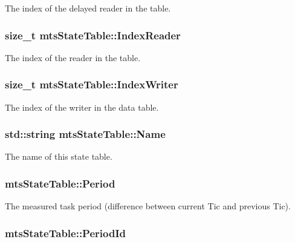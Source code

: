 The index of the delayed reader in the table. \hypertarget{classmts_state_table_a3735ec3378d9461a2a57028ec0e8aa70}{
\subsubsection[{Index\-Reader}]{\setlength{\rightskip}{0pt plus 5cm}size\-\_\-t mts\-State\-Table\-::\-Index\-Reader\hspace{0.3cm}{\ttfamily [protected]}}}\label{classmts_state_table_a3735ec3378d9461a2a57028ec0e8aa70}
The index of the reader in the table. \hypertarget{classmts_state_table_aec4f467171255f1898ec74f78f90a901}{
\subsubsection[{Index\-Writer}]{\setlength{\rightskip}{0pt plus 5cm}size\-\_\-t mts\-State\-Table\-::\-Index\-Writer\hspace{0.3cm}{\ttfamily [protected]}}}\label{classmts_state_table_aec4f467171255f1898ec74f78f90a901}
The index of the writer in the data table. \hypertarget{classmts_state_table_ad526708a4622c8cc4d9398bdb6b9ad5e}{
\subsubsection[{Name}]{\setlength{\rightskip}{0pt plus 5cm}std\-::string mts\-State\-Table\-::\-Name\hspace{0.3cm}{\ttfamily [protected]}}}\label{classmts_state_table_ad526708a4622c8cc4d9398bdb6b9ad5e}
The name of this state table. \hypertarget{classmts_state_table_a4b11db6f64680d32fa7a0fc79ee62862}{
\subsubsection[{Period}]{ mts\-State\-Table\-::\-Period}}\label{classmts_state_table_a4b11db6f64680d32fa7a0fc79ee62862}
The measured task period (difference between current Tic and previous Tic). \hypertarget{classmts_state_table_a1035a10fa91b94e61061abbd049d9eb6}{
\subsubsection[{Period\-Id}]{ mts\-State\-Table\-::\-Period\-Id\hspace{0.3cm}{\ttfamily [protected]}}}\label{classmts_state_table_a1035a10fa91b94e61061abbd049d9eb6}
